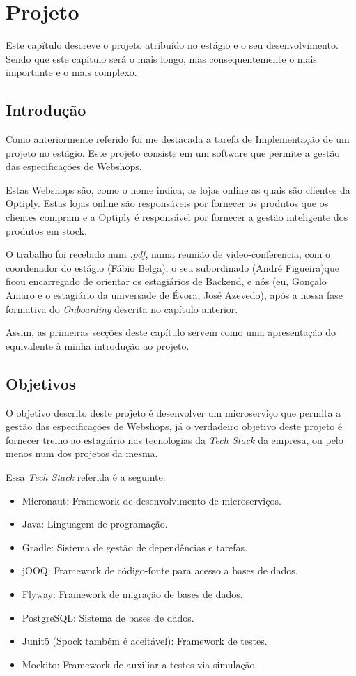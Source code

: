 \chapter{Projeto}
\label{cap4}

Este capítulo descreve o projeto atribuído no estágio e o seu desenvolvimento. Sendo que este capítulo será o mais longo, mas consequentemente o mais importante e o mais complexo.

\section{Introdução}

Como anteriormente referido foi me destacada a tarefa de Implementação de um projeto no estágio. Este projeto consiste em um software que permite a gestão das especificações de Webshops.

Estas Webshops são, como o nome indica, as lojas online as quais são clientes da Optiply. Estas lojas online são responsáveis por fornecer os produtos que os clientes compram e a Optiply é responsável por fornecer a gestão inteligente dos produtos em stock.

O trabalho foi recebido num \textit{.pdf}, numa reunião de video-conferencia, com o coordenador do estágio (Fábio Belga), o seu subordinado (André Figueira)que ficou encarregado de orientar os estagiários de Backend, e nós (eu, Gonçalo Amaro e o estagiário da universade de Évora, José Azevedo), após a nossa fase formativa do \textit{Onboarding} descrita no capítulo anterior.

Assim, as primeiras secções deste capítulo servem como uma apresentação do equivalente à minha introdução ao projeto.

\section{Objetivos}

O objetivo descrito deste projeto é desenvolver um microserviço que permita a gestão das especificações de Webshops, já o verdadeiro objetivo deste projeto é fornecer treino ao estagiário nas tecnologias da \textit{Tech Stack} da empresa, ou pelo menos num dos projetos da mesma.

\newpage

Essa \textit{Tech Stack} referida é a seguinte:

\begin{itemize}
  \item Micronaut: Framework de desenvolvimento de microserviços.
  \item Java: Linguagem de programação.
  \item Gradle: Sistema de gestão de dependências e tarefas.
  \item jOOQ: Framework de código-fonte para acesso a bases de dados.
  \item Flyway: Framework de migração de bases de dados.
  \item PostgreSQL: Sistema de bases de dados.
  \item Junit5 (Spock também é aceitável): Framework de testes.
  \item Mockito: Framework de auxiliar a testes via simulação.
\end{itemize}

